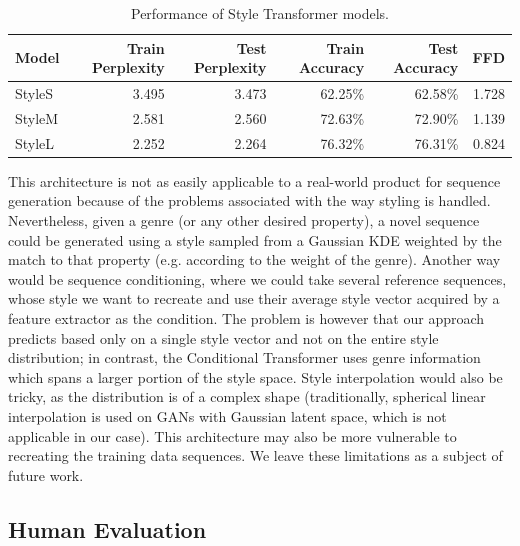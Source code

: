 \documentclass{article}
\begin{document}
\begin{table}[!htbp]
    \centering
    \begin{tabular}{lrrrrr}
        \toprule
        Model &  Train Perplexity & Test Perplexity & Train Accuracy & Test Accuracy & FFD \\
        \midrule
        StyleS & 3.495 & 3.473 & 62.25\% & 62.58\% & 1.728 \\
        StyleM & 2.581 & 2.560 & 72.63\% & 72.90\% & 1.139 \\
        StyleL & 2.252 & 2.264 & 76.32\% & 76.31\% & 0.824 \\
        \bottomrule
    \end{tabular}
    \caption{Performance of Style Transformer models.}
    \label{tab:style_transformer_performance}
\end{table}

This architecture is not as easily applicable to a real-world product for sequence generation because of the problems associated with the way styling is handled. Nevertheless, given a genre (or any other desired property), a novel sequence could be generated using a style sampled from a Gaussian KDE weighted by the match to that property (e.g. according to the weight of the genre). Another way would be sequence conditioning, where we could take several reference sequences, whose style we want to recreate and use their average style vector acquired by a feature extractor as the condition. The problem is however that our approach predicts based only on a single style vector and not on the entire style distribution; in contrast, the Conditional Transformer uses genre information which spans a larger portion of the style space. Style interpolation would also be tricky, as the distribution is of a complex shape (traditionally, spherical linear interpolation is used on GANs with Gaussian latent space, which is not applicable in our case). This architecture may also be more vulnerable to recreating the training data sequences. We leave these limitations as a subject of future work.
 
\subsection{Human Evaluation} \label{Human Evaluation}
\end{document}
